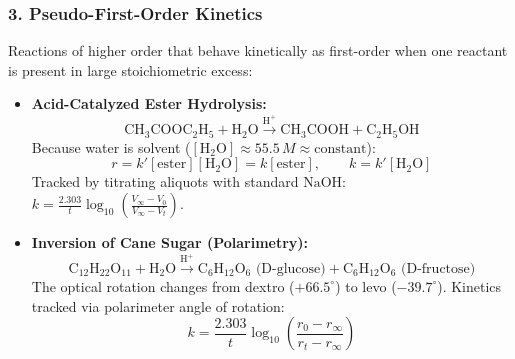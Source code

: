 \documentclass[10pt,twoside,openright]{book}
\begin{document}
\subsubsection{3. Pseudo-First-Order Kinetics}
Reactions of higher order that behave kinetically as first-order when one reactant is present in large stoichiometric excess:
\begin{itemize}
  \item \textbf{Acid-Catalyzed Ester Hydrolysis:}
  \begin{equation}
    \mathrm{CH_3COOC_2H_5} + \mathrm{H_2O} \xrightarrow{\mathrm{H^+}} \mathrm{CH_3COOH} + \mathrm{C_2H_5OH}
  \end{equation}
  Because water is solvent ($[\mathrm{H_2O}] \approx 55.5\,\si{M} \approx \text{constant}$):
  \begin{equation}
    r = k' [\mathrm{ester}][\mathrm{H_2O}] = k [\mathrm{ester}], \qquad k = k' [\mathrm{H_2O}]
  \end{equation}
  Tracked by titrating aliquots with standard $\mathrm{NaOH}$:\\[2pt]
  $k = \frac{2.303}{t}\log_{10}\left(\frac{V_\infty - V_0}{V_\infty - V_t}\right)$.
  \item \textbf{Inversion of Cane Sugar (Polarimetry):}
  \begin{equation}
    \mathrm{C_{12}H_{22}O_{11}} + \mathrm{H_2O} \xrightarrow{\mathrm{H^+}} \mathrm{C_6H_{12}O_6\text{ (D-glucose)}} + \mathrm{C_6H_{12}O_6\text{ (D-fructose)}}
  \end{equation}
  The optical rotation changes from dextro ($+66.5^\circ$) to levo ($-39.7^\circ$). Kinetics tracked via polarimeter angle of rotation:
  \begin{equation}
    k = \frac{2.303}{t}\log_{10}\left(\frac{r_0 - r_\infty}{r_t - r_\infty}\right)
  \end{equation}
\end{itemize}
\end{document}
